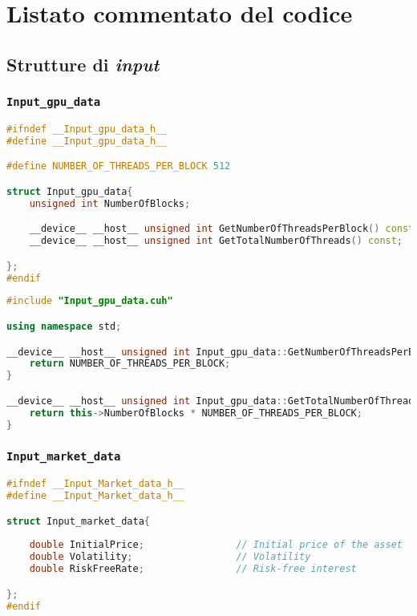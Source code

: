 \appendix
\chapter{Listato commentato del codice} \label{app:allcode}

\section{Strutture di \textit{input}}
\lipsum[1]

\subsection{\texttt{Input\_gpu\_data}}
\lipsum[1-3]

\begin{lstlisting}[language=C++, caption={\texttt{libraries/InputStructures/InputGPUData/Input\_gpu\_data.cuh}}]
#ifndef __Input_gpu_data_h__
#define __Input_gpu_data_h__

#define NUMBER_OF_THREADS_PER_BLOCK 512

struct Input_gpu_data{
	unsigned int NumberOfBlocks;

	__device__ __host__ unsigned int GetNumberOfThreadsPerBlock() const;
	__device__ __host__ unsigned int GetTotalNumberOfThreads() const;

};
#endif
\end{lstlisting}

\begin{lstlisting}[language=C++, caption={\texttt{libraries/InputStructures/InputGPUData/Input\_gpu\_data.cu}}]
#include "Input_gpu_data.cuh"

using namespace std;

__device__ __host__ unsigned int Input_gpu_data::GetNumberOfThreadsPerBlock() const{
	return NUMBER_OF_THREADS_PER_BLOCK;
}

__device__ __host__ unsigned int Input_gpu_data::GetTotalNumberOfThreads() const{
	return this->NumberOfBlocks * NUMBER_OF_THREADS_PER_BLOCK;
}
\end{lstlisting}

\subsection{\texttt{Input\_market\_data}}
\lipsum[1-3]

\begin{lstlisting}[language=C++, caption={\texttt{libraries/InputStructures/InputMarketData/Input\_market\_data.cuh}}]
#ifndef __Input_Market_data_h__
#define __Input_Market_data_h__

struct Input_market_data{
	
	double InitialPrice;				// Initial price of the asset
	double Volatility;					// Volatility
	double RiskFreeRate;				// Risk-free interest

};
#endif
\end{lstlisting}

